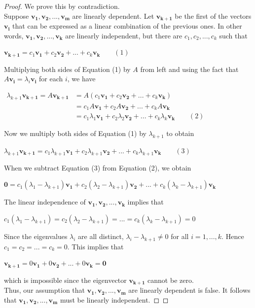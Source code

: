 \documentclass[
  letterpaper,
  DIV=11,
  numbers=noendperiod]{scrartcl}
\theoremstyle{remark}
\begin{document}
\begin{proof}
We prove this by contradiction.\\
Suppose \(\mathbf{v_{1}}, \mathbf{v_{2}}, ..., \mathbf{v_{m}}\) are
linearly dependent. Let \(\mathbf{v_{k+1}}\) be the first of the vectors
\(\mathbf{v_{i}}\) that can be expressed as a linear combination of the
previous ones. In other words,
\(\mathbf{v_{1}}, \mathbf{v_{2}}, ..., \mathbf{v_{k}}\) are linearly
independent, but there are \(c_{1}, c_{2}, ..., c_{k}\) such that

\(\mathbf{v_{k+1}} = c_{1}\mathbf{v_{1}} + c_{2}\mathbf{v_{2}} + ... + c_{k}\mathbf{v_{k}} \qquad (1)\)

Multiplying both sides of Equation (1) by \(A\) from left and using the
fact that \(A\mathbf{v_{i}} = \lambda _{i}\mathbf{v_{i}}\) for each
\(i\), we have

\(\begin{alignedat}{2}
        \lambda _{k+1}\mathbf{v_{k+1}} = A\mathbf{v_{k+1}} &= A(c_{1}\mathbf{v_{1}} + c_{2}\mathbf{v_{2}} + ... + c_{k}\mathbf{v_{k}}) \\
        {} &= c_{1}A\mathbf{v_{1}} + c_{2}A\mathbf{v_{2}} + ... + c_{k}A\mathbf{v_{k}} \\
        {} &= c_{1}\lambda _{1}\mathbf{v_{1}} + c_{2}\lambda _{2}\mathbf{v_{2}} + ... + c_{k}\lambda _{k}\mathbf{v_{k}} \qquad (2)
    \end{alignedat}\)

Now we multiply both sides of Equation (1) by \(\lambda _{k+1}\) to
obtain

\(\lambda _{k+1}\mathbf{v_{k+1}} = c_{1}\lambda _{k+1}\mathbf{v_{1}} + c_{2}\lambda _{k+1}\mathbf{v_{2}} + ... + c_{k}\lambda _{k+1}\mathbf{v_{k}} \qquad (3)\)

When we subtract Equation (3) from Equation (2), we obtain

\(\mathbf{0} = c_{1}(\lambda _{1}-\lambda _{k+1})\mathbf{v_{1}} + c_{2}(\lambda _{2}-\lambda _{k+1})\mathbf{v_{2}} + ... + c_{k}(\lambda _{k}-\lambda _{k+1})\mathbf{v_{k}}\)

The linear independence of
\(\mathbf{v_{1}}, \mathbf{v_{2}}, ..., \mathbf{v_{k}}\) implies that

\(c_{1}(\lambda _{1}-\lambda _{k+1}) = c_{2}(\lambda _{2}-\lambda _{k+1}) = ... = c_{k}(\lambda _{k}-\lambda _{k+1}) = 0\)

Since the eigenvalues \(\lambda _{i}\) are all distinct,
\(\lambda _{i} - \lambda _{k+1} \neq 0\) for all \(i = 1, ..., k\).
Hence \(c_{1} = c_{2} = ... = c_{k} = 0\). This implies that

\(\mathbf{v_{k+1}} = 0\mathbf{v_{1}} + 0\mathbf{v_{2}} + ... + 0\mathbf{v_{k}} = \mathbf{0}\)

which is impossible since the eigenvector \(\mathbf{v_{k+1}}\) cannot be
zero.\\
Thus, our assumption that
\(\mathbf{v_{1}}, \mathbf{v_{2}}, ..., \mathbf{v_{m}}\) are linearly
dependent is false. It follows that
\(\mathbf{v_{1}}, \mathbf{v_{2}}, ..., \mathbf{v_{m}}\) must be linearly
independent.~◻
\end{proof}
\end{document}
